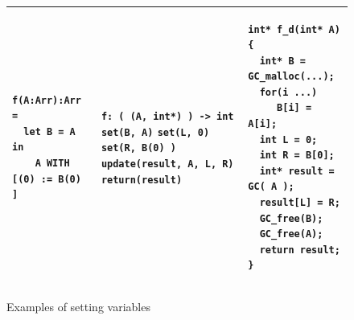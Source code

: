 \documentclass[12pt,a4paper,titlepage]{article}
\newcommand{\cl}[1]{\texttt{#1}}
\begin{document}
\begin{figure}[!ht]
\begin{tabular}{|p{5.2cm}|p{5.8cm}|p{6cm}|}
\begin{lstlisting}
f(A:Arr):Arr =
  let B = A in
    A WITH [(0) := B(0) ]
\end{lstlisting} &
\cl{f: ( (A, int*) ) -> int} \newline
\cl{set(B, A)} \newline
\cl{set(L, 0)} \newline
\cl{set(R, B(0) )} \newline
\cl{update(result, A, L, R)} \newline
\cl{return(result)} &
\begin{lstlisting}
int* f_d(int* A) {
  int* B = GC_malloc(...);
  for(i ...)
     B[i] = A[i];
  int L = 0;
  int R = B[0];
  int* result = GC( A );
  result[L] = R;
  GC_free(B);
  GC_free(A);
  return result;
}
\end{lstlisting} \\ \hline
\end{tabular}
\caption{Examples of setting variables}
\end{figure}
\end{document}
